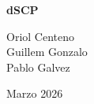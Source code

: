\begin{titlepage}
    \centering
    \vspace*{4cm}
    {\huge \bfseries dSCP \par}
    \vspace{1.5cm}
    {\Large Oriol Centeno\\Guillem Gonzalo\\Pablo Galvez \par}
    \vspace{1.5cm}
    {\large Marzo 2026 \par}
    \vfill
    \conteoTotal
    \vspace{1cm}
\end{titlepage}